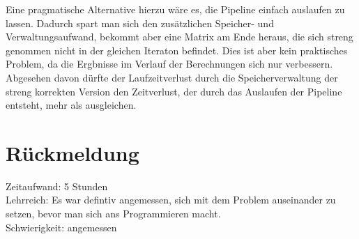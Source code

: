 \documentclass[a4paper]{scrartcl}
\begin{document}
Eine pragmatische Alternative hierzu wäre es, die Pipeline einfach auslaufen 
zu lassen. Dadurch spart man sich den zusätzlichen Speicher- und 
Verwaltungsaufwand, bekommt aber eine Matrix am Ende heraus, die sich streng 
genommen nicht in der gleichen Iteraton befindet. Dies ist aber kein 
praktisches Problem, da die Ergbnisse im Verlauf der Berechnungen sich nur 
verbessern. Abgesehen davon dürfte der Laufzeitverlust durch die 
Speicherverwaltung der streng korrekten Version den Zeitverlust, der durch 
das Auslaufen der Pipeline entsteht, mehr als ausgleichen.

\section{Rückmeldung}
Zeitaufwand: 5 Stunden\\
Lehrreich: Es war defintiv angemessen, sich mit dem Problem auseinander zu setzen, bevor man sich ans Programmieren macht.\\
Schwierigkeit: angemessen
\end{document}

